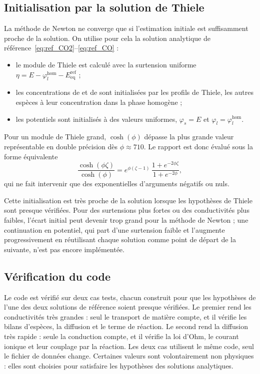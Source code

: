 \subsection*{Initialisation par la solution de Thiele}

La méthode de Newton ne converge que si l'estimation initiale est
suffisamment proche de la solution. On utilise pour cela la solution
analytique de référence~\eqref{eq:ref_CO2}--\eqref{eq:ref_CO} :
\begin{itemize}
    \item le module de Thiele est calculé avec la surtension uniforme
    $\eta = E - \varphi_l^{\mathrm{hom}} - E_{\mathrm{eq}}^{\mathrm{ref}}$ ;
    \item les concentrations de  et de  sont initialisées par
    les profils de Thiele, les autres espèces à leur concentration dans la
    phase homogène ;
    \item les potentiels sont initialisés à des valeurs uniformes,
    $\varphi_s = E$ et $\varphi_l = \varphi_l^{\mathrm{hom}}$.
\end{itemize}
Pour un module de Thiele grand, $\cosh(\phi)$ dépasse la plus grande valeur
représentable en double précision dès $\phi \approx 710$. Le rapport est donc
évalué sous la forme équivalente
\begin{equation}
\frac{\cosh(\phi\zeta)}{\cosh(\phi)}
= e^{\phi(\zeta - 1)}\,
\frac{1 + e^{-2\phi\zeta}}{1 + e^{-2\phi}} ,
\end{equation}
qui ne fait intervenir que des exponentielles d'arguments négatifs ou nuls.

Cette initialisation est très proche de la solution lorsque les hypothèses de
Thiele sont presque vérifiées. Pour des surtensions plus fortes ou des
conductivités plus faibles, l'écart initial peut devenir trop grand pour la
méthode de Newton ; une continuation en potentiel, qui part d'une surtension
faible et l'augmente progressivement en réutilisant chaque solution comme
point de départ de la suivante, n'est pas encore implémentée.

\subsection*{Vérification du code}

Le code est vérifié sur deux cas tests, chacun construit pour que les
hypothèses de l'une des deux solutions de référence soient presque
vérifiées. Le premier rend les conductivités très grandes : seul le transport
de matière compte, et il vérifie les bilans d'espèces, la diffusion et le
terme de réaction. Le second rend la diffusion très rapide : seule la
conduction compte, et il vérifie la loi d'Ohm, le courant ionique et leur
couplage par la réaction. Les deux cas utilisent le même code, seul le
fichier de données change. Certaines valeurs sont volontairement non
physiques : elles sont choisies pour satisfaire les hypothèses des solutions
analytiques.

